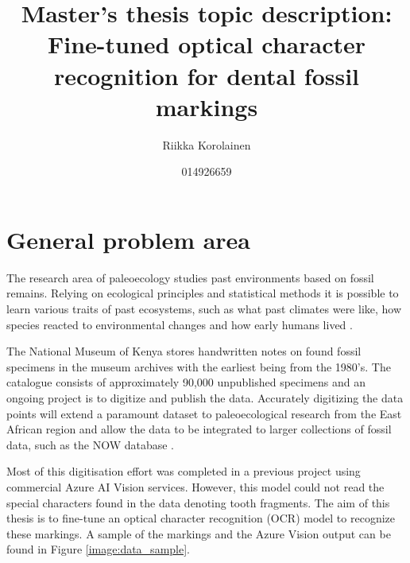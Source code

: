 \documentclass{article}
\title{Master's thesis topic description: Fine-tuned optical character recognition for dental fossil markings}
\author{Riikka Korolainen}
\date{014926659}
\begin{document}
\maketitle

\section{General problem area}

The research area of paleoecology studies past environments based on fossil remains.
Relying on ecological principles and statistical methods it is possible to learn various
traits of past ecosystems, such as what past climates were like, how species reacted 
to environmental changes and how early humans lived \cite{Faith_Lyman_2019}.



The National Museum of Kenya stores handwritten notes on found fossil specimens in the 
museum archives with the earliest being from the 1980's. The catalogue consists of 
approximately 90,000 unpublished specimens and an ongoing project is to digitize 
and publish the data. Accurately digitizing the data points will extend a paramount dataset 
to paleoecological research from the East African region and allow the data to be integrated 
to larger collections of fossil data, such as the NOW database \cite{Žliobaitė2023}.


Most of this digitisation effort was completed in a previous project using commercial 
Azure AI Vision services. However, this model could not read the special characters found 
in the data denoting tooth fragments. The aim of this thesis is to fine-tune an 
optical character recognition (OCR) model to recognize these markings. A sample of the markings and 
the Azure Vision output can be found in Figure \ref{image:data_sample}.
\end{document}
